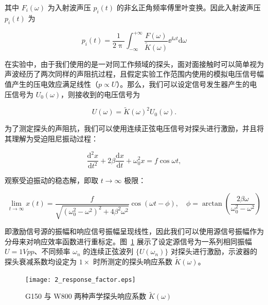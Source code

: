 其中 $F_{i}(\omega)$ 为入射波声压 $p_{i}(t)$ 的非幺正角频率傅里叶变换。因此入射波声压 $p_{i}(t)$ 为

\begin{equation}
  p_{i}(t) = \frac{1}{2\uppi}\int_{-\infty}^{+\infty}\frac{F(\omega)}{\widetilde{K}(\omega)}{\ee}^{\ii\omega t}\mathrm{d}\omega\label{eq:response_correct}
\end{equation}

在实验中，由于我们使用的是一对同工作频域的探头，面对面接触时可以简单视为声波经历了两次同样的声阻抗过程，且假定实验工作范围内使用的模拟电压信号幅值产生的压电效应满足线性（$p\propto U$）。那么，我们可以设定信号发生器产生的电压信号为 $U_{0}(\omega)$，则接收到的电压信号为

\begin{equation}
  U(\omega) = \widetilde{K}(\omega)^{2}U_{0}(\omega).
\end{equation}

为了测定探头的声阻抗，我们可以使用连续正弦电压信号对探头进行激励，并且将其理解为受迫阻尼振动过程：

\begin{equation}
  \frac{\mathrm{d}^{2}x}{\mathrm{d}t^{2}} + 2\beta\frac{\mathrm{d}x}{\mathrm{d}t} + \omega_{0}^{2}x = f\cos{\omega t},
\end{equation}

观察受迫振动的稳态解，即取 $t\rightarrow \infty$ 极限：

\begin{equation}
  \lim_{t\rightarrow \infty} x(t) = \frac{f}{\sqrt{(\omega_{0}^{2} - \omega^{2})^{2} + 4\beta^{2}\omega^{2}}}\cos{(\omega t - \phi)},\quad \phi = \arctan{\left(\frac{2\beta\omega}{\omega_{0}^{2}-\omega^{2}}\right)}
\end{equation}

即激励信号源的振幅和响应信号振幅呈现线性，因此我们可以使用源信号振幅作为分母来对响应效率函数进行重标定。图~\ref{fig:response_factor} 展示了设定源信号为一系列相同振幅 $U = 1\unit{Vpp}$、不同频率 $\omega_{n}$ 的连续正弦波列 $\{U(\omega_{n})\}$ 对探头进行激励，示波器的探头衰减系数均设定为 $1\times $ 时所测定的探头响应系数 $\widetilde{K}(\omega)$。

\begin{figure}[!htp]
  \centering
  \texttt{[image: 2\_response\_factor.eps]}
  \caption{G150 与 W800 两种声学探头响应系数 $\widetilde{K}(\omega)$}%
  \label{fig:response_factor}
\end{figure}

